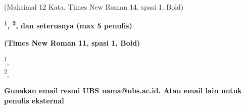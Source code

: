 \begin{center}
    {\large\bfseries \MakeUppercase{\judulid}\par}
    \vspace{2pt}
    {\large (Maksimal 12 Kata, Times New Roman 14, spasi 1, Bold)\par}

    \vspace{12pt}

    {\small\bfseries \penulis\textsuperscript{1}, \penulisdua\textsuperscript{2}, dan seterusnya (max 5 penulis)\par}
    {\small\bfseries (Times New Roman 11, spasi 1, Bold)\par}

    \vspace{8pt}

    {\small
        \textsuperscript{1}\universitas, \email\\
        \textsuperscript{2}\institusidua, \emaildua\par}

    \vspace{4pt}
    {\small\bfseries Gunakan email resmi UBS nama@ubs.ac.id. Atau email lain untuk penulis eksternal\par}
\end{center}